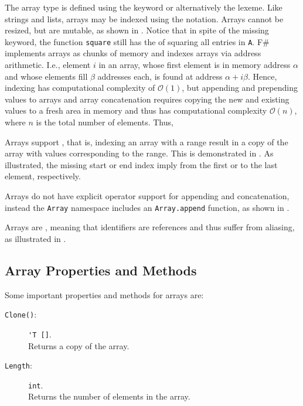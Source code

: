 \documentclass[fsharpNotes.tex]{subfiles}
\begin{document}
The array type is defined using the  keyword or alternatively the \lexeme{[]} lexeme.  Like strings and lists, arrays may be indexed using the \idx[{[]}@\lstinline{[]}]{\lexeme{[]}} notation. Arrays cannot be resized, but are mutable, as shown in .
%
%
Notice that in spite of the missing  keyword, the function \lstinline{square} still has the  of squaring all entries in \lstinline{A}.  F\# implements arrays as chunks of memory and indexes arrays via address arithmetic. I.e., element $i$ in an array, whose first element is in memory address $\alpha$ and whose elements fill $\beta$ addresses each, is found at address $\alpha+i\beta$. Hence, indexing has computational complexity of $\mathcal{O}(1)$, but appending and prepending values to arrays and array concatenation requires copying the new and existing values to a fresh area in memory and thus has computational complexity $\mathcal{O}(n)$, where $n$ is the total number of elements. Thus, 

Arrays support , that is, indexing an array with a range result in a copy of the array with values corresponding to the range. This is demonstrated in .
%
%
As illustrated, the missing start or end index imply from the first or to the last element, respectively.

Arrays do not have explicit operator support for appending and concatenation, instead the \lstinline{Array} namespace includes an \lstinline{Array.append} function, as shown in .
%
%

Arrays are , meaning that identifiers are references and thus suffer from aliasing, as illustrated in .
%
%
\clearpage

\subsection{Array Properties and Methods}
\label{sec:arrayMethods}
Some important properties and methods for arrays are:
\begin{description}
\item[\texttt{Clone()}:] \lstinline{'T []}.~\\
  Returns a copy of the array.
\item[\texttt{Length}:] \lstinline{int}.~\\
  Returns the number of elements in the array.
\end{description}
\end{document}
